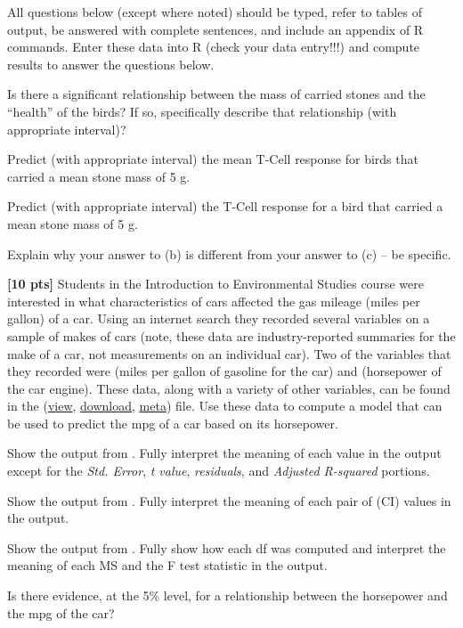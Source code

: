 \documentclass[10pt,openany]{book}\usepackage[]{graphicx}\usepackage[]{color}
\begin{document}
\begin{hwsection}{All questions below (except where noted) should be typed, refer to tables of output, be answered with complete sentences, and include an appendix of R commands.}
  Enter these data into R (check your data entry!!!) and compute results to answer the questions below.
    \begin{Enumerate}
      \item Is there a significant relationship between the mass of carried stones and the ``health'' of the birds?  If so, specifically describe that relationship (with appropriate interval)?
      \item Predict (with appropriate interval) the mean T-Cell response for birds that carried a mean stone mass of 5 g.
      \item Predict (with appropriate interval) the T-Cell response for a bird that carried a mean stone mass of 5 g.
      \item Explain why your answer to (b) is different from your answer to (c) -- be specific.
    \end{Enumerate}

  \item \label{hwprob:LMSLRCarMPG1} \textbf{[10 pts]} Students in the Introduction to Environmental Studies course were interested in what characteristics of cars affected the gas mileage (miles per gallon) of a car.  Using an internet search they recorded several variables on a sample of makes of cars (note, these data are industry-reported summaries for the make of a car, not measurements on an individual car).  Two of the variables that they recorded were  (miles per gallon of gasoline for the car) and  (horsepower of the car engine).  These data, along with a variety of other variables, can be found in the  (\href{https://github.com/droglenc/NCData/blob/master/CarMPG.csv}{view}, \href{https://raw.githubusercontent.com/droglenc/NCData/master/CarMPG.csv}{download}, \href{https://github.com/droglenc/NCData/blob/master/CarMPG_meta.txt}{meta}) file.  Use these data to compute a model that can be used to predict the mpg of a car based on its horsepower.
    \begin{Enumerate}
      \item Show the output from .  Fully interpret the meaning of each value in the output except for the \emph{Std. Error}, \emph{t value}, \emph{residuals}, and \emph{Adjusted R-squared} portions.
      \item Show the output from .  Fully interpret the meaning of each pair of (CI) values in the output.
      \item Show the output from .  Fully show how each df was computed and interpret the meaning of each MS and the F test statistic in the output.
      \item Is there evidence, at the 5\% level, for a relationship between the horsepower and the mpg of the car?
    \end{Enumerate}


\end{hwsection}
\end{document}
